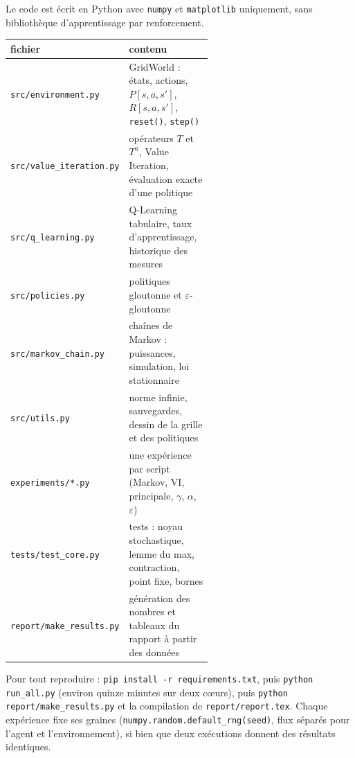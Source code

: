 Le code est écrit en Python avec \texttt{numpy} et \texttt{matplotlib} uniquement, sans bibliothèque d'apprentissage par renforcement.

\begin{center}
\small
\begin{tabular}{l>{\raggedright\arraybackslash}p{0.58\linewidth}}
\toprule
fichier & contenu\\
\midrule
\texttt{src/environment.py} & GridWorld : états, actions, $P[s,a,s']$, $R[s,a,s']$, \texttt{reset()}, \texttt{step()}\\
\texttt{src/value\_iteration.py} & opérateurs $T$ et $T^\pi$, Value Iteration, évaluation exacte d'une politique\\
\texttt{src/q\_learning.py} & Q-Learning tabulaire, taux d'apprentissage, historique des mesures\\
\texttt{src/policies.py} & politiques gloutonne et $\varepsilon$-gloutonne\\
\texttt{src/markov\_chain.py} & chaînes de Markov : puissances, simulation, loi stationnaire\\
\texttt{src/utils.py} & norme infinie, sauvegardes, dessin de la grille et des politiques\\
\texttt{experiments/*.py} & une expérience par script (Markov, VI, principale, $\gamma$, $\alpha$, $\varepsilon$)\\
\texttt{tests/test\_core.py} & tests : noyau stochastique, lemme du max, contraction, point fixe, bornes\\
\texttt{report/make\_results.py} & génération des nombres et tableaux du rapport à partir des données\\
\bottomrule
\end{tabular}
\end{center}

Pour tout reproduire : \texttt{pip install -r requirements.txt}, puis \texttt{python run\_all.py} (environ quinze minutes sur deux cœurs), puis \texttt{python report/make\_results.py} et la compilation de \texttt{report/report.tex}. Chaque expérience fixe ses graines (\texttt{numpy.random.default\_rng(seed)}, flux séparés pour l'agent et l'environnement), si bien que deux exécutions donnent des résultats identiques.
